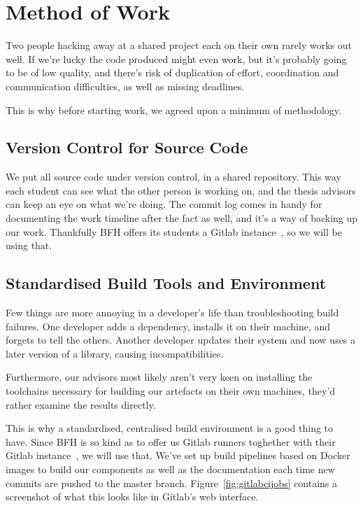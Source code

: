 \section{Method of Work}\label{sec:method-of-work}
Two people hacking away at a shared project each on their own rarely works out well.
If we're lucky the code produced might even work, but it's probably going to be of low quality,
and there's risk of duplication of effort,
coordination and communication difficulties,
as well as missing deadlines.

This is why before starting work, we agreed upon a minimum of methodology.

\subsection{Version Control for Source Code}\label{subsec:version-control-for-source-code}
We put all source code under version control, in a shared repository.
This way each student can see what the other person is working on,
and the thesis advisors can keep an eye on what we're doing.
The commit log comes in handy for documenting the work timeline after the fact as well,
and it's a way of backing up our work.
Thankfully \gls{BFH} offers its students a Gitlab instance~\cite{gitlab}, so we will be using that.

\subsection{Standardised Build Tools and Environment}\label{subsec:standardised-build-tools-and-environment}
Few things are more annoying in a developer's life than troubleshooting build failures.
One developer adds a dependency, installs it on their machine, and forgets to tell the others.
Another developer updates their system and now uses a later version of a library, causing incompatibilities.

Furthermore,
our advisors most likely aren't very keen on installing the toolchains necessary for building our artefacts on their own machines,
they'd rather examine the results directly.

This is why a standardised, centralised build environment is a good thing to have.
Since \gls{BFH} is so kind as to offer us Gitlab runners toghether with their Gitlab instance~\cite{gitlab},
we will use that.
We've set up build pipelines based on Docker images to build our components as well as the documentation each time new commits are pushed to the master branch.
Figure~\ref{fig:gitlabcijobs} contains a screenshot of what this looks like in Gitlab's web interface.

